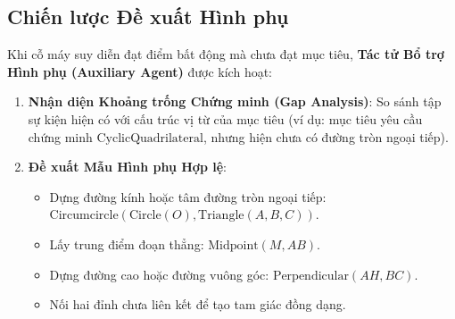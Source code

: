 \subsection{Chiến lược Đề xuất Hình phụ}
Khi cỗ máy suy diễn đạt điểm bất động mà chưa đạt mục tiêu, \textbf{Tác tử Bổ trợ Hình phụ (Auxiliary Agent)} được kích hoạt:
\begin{enumerate}
    \item \textbf{Nhận diện Khoảng trống Chứng minh (Gap Analysis)}: So sánh tập sự kiện hiện có với cấu trúc vị từ của mục tiêu (ví dụ: mục tiêu yêu cầu chứng minh $\text{CyclicQuadrilateral}$, nhưng hiện chưa có đường tròn ngoại tiếp).
    \item \textbf{Đề xuất Mẫu Hình phụ Hợp lệ}:
    \begin{itemize}
        \item Dựng đường kính hoặc tâm đường tròn ngoại tiếp: $\text{Circumcircle}(\text{Circle}(O), \text{Triangle}(A, B, C))$.
        \item Lấy trung điểm đoạn thẳng: $\text{Midpoint}(M, AB)$.
        \item Dựng đường cao hoặc đường vuông góc: $\text{Perpendicular}(AH, BC)$.
        \item Nối hai đỉnh chưa liên kết để tạo tam giác đồng dạng.
    \end{itemize}
\end{enumerate}
